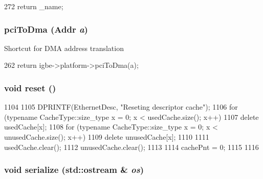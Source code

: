 \begin{DoxyCode}
272 { return _name; }
\end{DoxyCode}
\hypertarget{classIGbE_1_1DescCache_aaeea87c73c95205c88d11e03fe8f48b9}{
\subsubsection[{pciToDma}]{ pciToDma ({\bf Addr} {\em a})}}
\label{classIGbE_1_1DescCache_aaeea87c73c95205c88d11e03fe8f48b9}
Shortcut for DMA address translation 


\begin{DoxyCode}
262 { return igbe->platform->pciToDma(a); }
\end{DoxyCode}
\hypertarget{classIGbE_1_1DescCache_ad20897c5c8bd47f5d4005989bead0e55}{
\subsubsection[{reset}]{\setlength{\rightskip}{0pt plus 5cm}void reset ()}}
\label{classIGbE_1_1DescCache_ad20897c5c8bd47f5d4005989bead0e55}



\begin{DoxyCode}
1104 {
1105     DPRINTF(EthernetDesc, "Reseting descriptor cache\n");
1106     for (typename CacheType::size_type x = 0; x < usedCache.size(); x++)
1107         delete usedCache[x];
1108     for (typename CacheType::size_type x = 0; x < unusedCache.size(); x++)
1109         delete unusedCache[x];
1110 
1111     usedCache.clear();
1112     unusedCache.clear();
1113 
1114     cachePnt = 0;
1115 
1116 }
\end{DoxyCode}
\hypertarget{classIGbE_1_1DescCache_a53e036786d17361be4c7320d39c99b84}{
\subsubsection[{serialize}]{\setlength{\rightskip}{0pt plus 5cm}void serialize (std::ostream \& {\em os})}}
\label{classIGbE_1_1DescCache_a53e036786d17361be4c7320d39c99b84}


